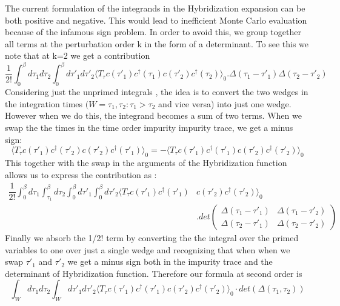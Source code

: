 \documentclass[10pt]{ruthesis}
\begin{document}
The current formulation of the integrands in the Hybridization expansion can be both positive and negative. This would lead to inefficient Monte Carlo evaluation because of the infamous sign problem. In order to avoid this, we group together all terms at the perturbation order k in the form of a determinant. To see this we note that at k=2 we get a contribution 
\begin{equation}
\dfrac{1}{2!}\int_{0}^{\beta}d\tau_{1}d\tau_{2}\int_{0}^{\beta}d\tau'_{1}d\tau'_{2}\langle T_{\tau} c(\tau'_{1})c^{\dagger}(\tau_{1})c(\tau'_{2})c^{\dagger}(\tau_{2})\rangle_{0}. \Delta(\tau_{1}-\tau'_{1})\Delta(\tau_{2}-\tau'_{2})
\end{equation}
Considering just the unprimed integrals , the idea is to convert the two wedges in the integration times $(W={\tau_{1},\tau_{2}:\tau_{1}>\tau_{2}}$ and vice versa) into just one wedge. However when we do this, the integrand becomes a sum of two terms. When we swap the the times in the time order impurity impurity trace, we get a minus sign:
\begin{equation}
 \langle T_{\tau} c(\tau'_{1})c^{\dagger}(\tau'_{2})c(\tau'_{2})c^{\dagger}(\tau'_{1})\rangle_{0}=-\langle T_{\tau} c(\tau'_{1})c^{\dagger}(\tau'_{1})c(\tau'_{2})c^{\dagger}(\tau'_{2})\rangle_{0}
 \end{equation} 
 This together with the swap in the arguments of the Hybridization function allows us to express the contribution as :
\begin{align}
\dfrac{1}{2!}\int_{0}^{\beta}d\tau_{1}\int_{\tau_{1}}^{\beta}d\tau_{2}\int_{0}^{\beta}
d\tau'_{1}\int_{0}^{\beta}d\tau'_{2}\langle T_{\tau} c(\tau'_{1})c^{\dagger}(\tau'_{1})&c(\tau'_{2})c^{\dagger}(\tau'_{2})\rangle_{0}\\
&.det \begin{pmatrix}
\Delta(\tau_{1}-\tau'_{1})&\Delta(\tau_{1}-\tau'_{2})\\\Delta(\tau_{2}-\tau'_{1}) & \Delta(\tau_{2}-\tau'_{2}) 
\end{pmatrix}
 \end{align} 
 Finally we absorb the 1/2! term by converting the the integral over the primed variables to one over just a single wedge and recognizing that when when we swap $\tau'_{1}$ and $\tau'_{2}$ we get a minus sign both in the impurity trace and the determinant of Hybridization function. Therefore our formula at second order is
 \begin{equation}
  \int_{W}d\tau_{1}d\tau_{2} \int_{W}d\tau'_{1}d\tau'_{2} \langle T_{\tau} c(\tau'_{1})c^{\dagger}(\tau'_{1})c(\tau'_{2})c^{\dagger}(\tau'_{2})\rangle_{0}\cdot det(\Delta({\tau_{1}},{\tau_{2}}))
  \end{equation} 
\end{document}

